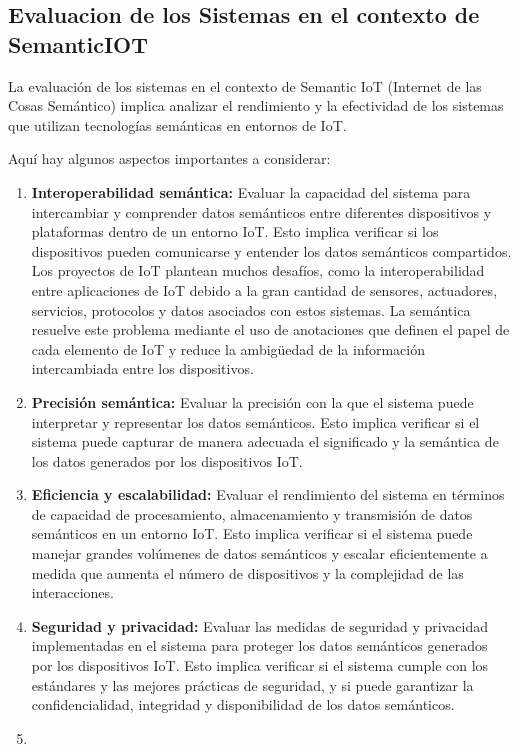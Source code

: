 \documentclass[12pt]{article}
\begin{document}
\subsection{Evaluacion de los Sistemas en el contexto de SemanticIOT}

La evaluación de los sistemas en el contexto de Semantic IoT (Internet de las Cosas Semántico) implica analizar el rendimiento y la efectividad de los sistemas que utilizan tecnologías semánticas en entornos de IoT.

Aquí hay algunos aspectos importantes a considerar:

\begin{enumerate}
    \item {
       
        \textbf{Interoperabilidad semántica:} \citep{ref8} Evaluar la capacidad del sistema para intercambiar y comprender datos semánticos entre diferentes dispositivos y plataformas dentro de un entorno IoT. Esto implica verificar si los dispositivos pueden comunicarse y entender los datos semánticos compartidos. Los proyectos de IoT plantean muchos desafíos, como la interoperabilidad entre aplicaciones de IoT debido a la gran cantidad de sensores, actuadores, servicios, protocolos y datos asociados con estos sistemas. La semántica resuelve este problema mediante el uso de anotaciones que definen el papel de cada elemento de IoT y reduce la ambigüedad de la información intercambiada entre los dispositivos.
    
    }
    \item {
    
        \textbf{Precisión semántica:} Evaluar la precisión con la que el sistema puede interpretar y representar los datos semánticos. Esto implica verificar si el sistema puede capturar de manera adecuada el significado y la semántica de los datos generados por los dispositivos IoT.
    }
    \item {
        
        \textbf{Eficiencia y escalabilidad:} Evaluar el rendimiento del sistema en términos de capacidad de procesamiento, almacenamiento y transmisión de datos semánticos en un entorno IoT. Esto implica verificar si el sistema puede manejar grandes volúmenes de datos semánticos y escalar eficientemente a medida que aumenta el número de dispositivos y la complejidad de las interacciones.

    }
    \item {
        
        \textbf{Seguridad y privacidad:} Evaluar las medidas de seguridad y privacidad implementadas en el sistema para proteger los datos semánticos generados por los dispositivos IoT. Esto implica verificar si el sistema cumple con los estándares y las mejores prácticas de seguridad, y si puede garantizar la confidencialidad, integridad y disponibilidad de los datos semánticos.
    }
    \item {
        
}
\end{enumerate}
\end{document}
